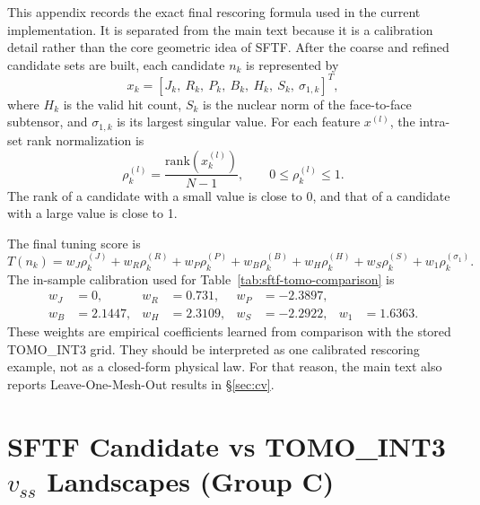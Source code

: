 \documentclass[11pt,a4paper]{article}
\begin{document}
This appendix records the exact final rescoring formula used in the current implementation.
It is separated from the main text because it is a calibration detail rather than the core geometric idea of SFTF.
After the coarse and refined candidate sets are built, each candidate $n_k$ is represented by
\begin{equation}
x_k
=
\left[
J_k,\ R_k,\ P_k,\ B_k,\ H_k,\ S_k,\ \sigma_{1,k}
\right]^T ,
\end{equation}
where $H_k$ is the valid hit count, $S_k$ is the nuclear norm of the face-to-face subtensor, and $\sigma_{1,k}$ is its largest singular value.
For each feature $x^{(l)}$, the intra-set rank normalization is
\begin{equation}
\rho^{(l)}_k
=
\frac{\mathrm{rank}(x^{(l)}_k)}{N-1},
\qquad
0\le \rho^{(l)}_k\le 1 .
\end{equation}
The rank of a candidate with a small value is close to 0, and that of a candidate with a large value is close to 1.

The final tuning score is
\begin{equation}
T(n_k)
=
w_J\rho^{(J)}_k
+w_R\rho^{(R)}_k
+w_P\rho^{(P)}_k
+w_B\rho^{(B)}_k
+w_H\rho^{(H)}_k
+w_S\rho^{(S)}_k
+w_1\rho^{(\sigma_1)}_k .
\end{equation}
The in-sample calibration used for Table~\ref{tab:sftf-tomo-comparison} is
\begin{equation}
\begin{aligned}
w_J&=0, &
w_R&=0.731, &
w_P&=-2.3897,\\
w_B&=2.1447, &
w_H&=2.3109, &
w_S&=-2.2922, &
w_1&=1.6363 .
\end{aligned}
\end{equation}
These weights are empirical coefficients learned from comparison with the stored TOMO\_INT3 grid.
They should be interpreted as one calibrated rescoring example, not as a closed-form physical law.
For that reason, the main text also reports Leave-One-Mesh-Out results in \S\ref{sec:cv}.

\section{SFTF Candidate vs TOMO\_INT3 $v_{ss}$ Landscapes (Group C)}
\label{sec:appendix-landscape}
\end{document}

